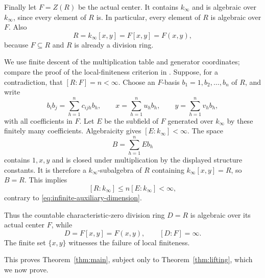 Finally let $F=Z(R)$ be the actual center.  It contains $k_\infty$ and
is algebraic over $k_\infty$, since every element of $R$ is.  In
particular, every element of $R$ is algebraic over $F$.  Also
\[
 R=k_\infty[x,y]=F[x,y]=F(x,y),
\]
because $F\subseteq R$ and $R$ is already a division ring.

We use finite descent of the multiplication table and generator
coordinates; compare the proof of the local-finiteness criterion in
\cite[Section~4]{DeoBienHai2019}. Suppose, for a contradiction, that
$[R:F]=n<\infty$. Choose an
$F$-basis $b_1=1,b_2,\ldots,b_n$ of $R$, and write
\[
 b_i b_j=\sum_{h=1}^n c_{ijh}b_h,
 \qquad
 x=\sum_{h=1}^n u_hb_h,
 \qquad
 y=\sum_{h=1}^n v_hb_h,
\]
with all coefficients in $F$.  Let $E$ be the subfield of $F$
generated over $k_\infty$ by these finitely many coefficients.
Algebraicity gives $[E:k_\infty]<\infty$.  The space
\[
 B=\sum_{h=1}^n E b_h
\]
contains $1,x,y$ and is closed under multiplication by the displayed
structure constants.  It is therefore a $k_\infty$-subalgebra of $R$
containing $k_\infty[x,y]=R$, so $B=R$.  This implies
\[
 [R:k_\infty]\leq n[E:k_\infty]<\infty,
\]
contrary to \eqref{eq:infinite-auxiliary-dimension}.

Thus the countable characteristic-zero division ring $D=R$ is
algebraic over its actual center $F$, while
\[
 D=F[x,y]=F(x,y),\qquad [D:F]=\infty.
\]
The finite set $\{x,y\}$ witnesses the failure of local finiteness.

This proves Theorem~\ref{thm:main}, subject only to Theorem~\ref{thm:lifting},
which we now prove.
